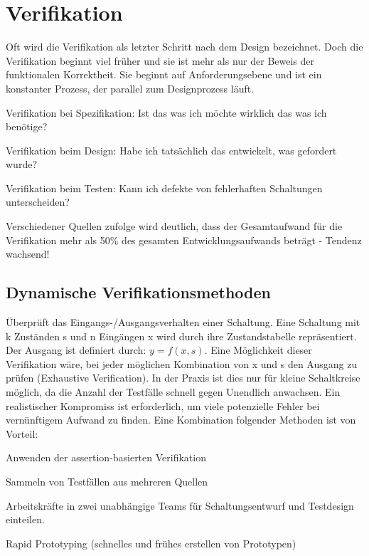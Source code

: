 \section{Verifikation}
Oft wird die Verifikation als letzter Schritt nach dem Design bezeichnet. Doch die Verifikation beginnt viel früher und sie ist mehr als nur der Beweis der funktionalen Korrektheit. Sie beginnt auf Anforderungsebene und ist ein konstanter Prozess, der parallel zum Designprozess läuft.
\begin{compactitem}
    \item Verifikation bei Spezifikation: Ist das was ich möchte wirklich das was ich benötige?
    \item Verifikation beim Design: Habe ich tatsächlich das entwickelt, was gefordert wurde?
    \item Verifikation beim Testen: Kann ich defekte von fehlerhaften Schaltungen unterscheiden?
\end{compactitem}
Verschiedener Quellen zufolge wird deutlich, dass der Gesamtaufwand für die Verifikation mehr als 50\% des gesamten Entwicklungsaufwands beträgt - Tendenz wachsend!
\subsection{Dynamische Verifikationsmethoden}
Überprüft das Eingangs-/Ausgangsverhalten einer Schaltung. Eine Schaltung mit k Zuständen s und n Eingängen x wird durch ihre Zustandstabelle repräsentiert. Der Ausgang ist definiert durch: $y=f(x,s)$. Eine Möglichkeit dieser Verifikation wäre, bei jeder möglichen Kombination von x und s den Ausgang zu prüfen (Exhaustive Verification). In der Praxis ist dies nur für kleine Schaltkreise möglich, da die Anzahl der Testfälle schnell gegen Unendlich anwachsen. Ein realistischer Kompromiss ist erforderlich, um viele potenzielle Fehler bei vernünftigem Aufwand zu finden. Eine Kombination folgender Methoden ist von Vorteil:
\begin{compactitem}
    \item Anwenden der assertion-basierten Verifikation
    \item Sammeln von Testfällen aus mehreren Quellen
    \item Arbeitskräfte in zwei unabhängige Teams für Schaltungsentwurf und Testdesign einteilen.
    \item Rapid Prototyping (schnelles und frühes erstellen von Prototypen)
\end{compactitem}
